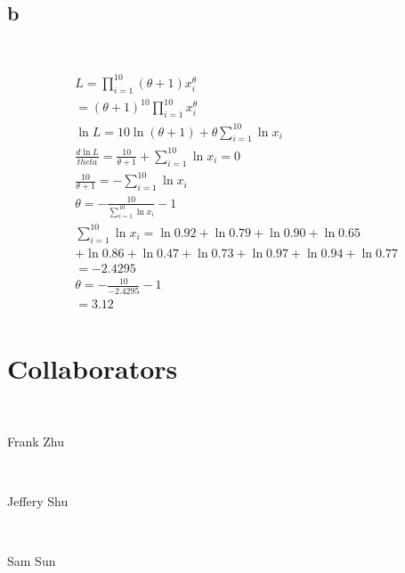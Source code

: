 \documentclass{article}
\begin{document}
~

\subsection*{b}

~

\begin{align*}
    &L=\prod_{i=1}^{10}(\theta+1)x_i^\theta\\
    &=(\theta+1)^10\prod_{i=1}^{10}x_i^\theta\\
    &\ln L=10\ln(\theta+1)+\theta\sum_{i=1}^{10}\ln x_i\\
    &\frac{d \ln L}{theta}=\frac{10}{\theta+1}+\sum_{i=1}^{10}\ln x_i=0\\
    &\frac{10}{\theta+1}=-\sum_{i=1}^{10}\ln x_i\\
    &\theta=-\frac{10}{\sum_{i=1}^{10}\ln x_i}-1\\
    &\sum_{i=1}^{10}\ln x_i=\ln0.92+\ln0.79+\ln0.90+\ln0.65\\
    &+\ln0.86+\ln0.47+\ln0.73+\ln0.97+\ln0.94+\ln0.77\\
    &=-2.4295\\
    &\theta=-\frac{10}{-2.4295}-1\\
    &=3.12\\
\end{align*}

\newpage

\section*{Collaborators}

~

Frank Zhu

~

Jeffery Shu

~

Sam Sun
\end{document}
